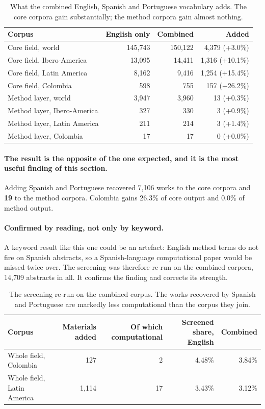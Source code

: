 \documentclass[11pt,a4paper]{article}
\begin{document}
\begin{table}[htbp]
\centering
\caption{What the combined English, Spanish and Portuguese vocabulary adds. The core
corpora gain substantially; the method corpora gain almost nothing.}
\label{tab:combined}
\small
\begin{tabular}{lrrr}
\toprule
Corpus & English only & Combined & Added \\
\midrule
Core field, world & 145,743 & 150,122 & 4,379 (+3.0\%) \\
Core field, Ibero-America & 13,095 & 14,411 & 1,316 (+10.1\%) \\
Core field, Latin America & 8,162 & 9,416 & 1,254 (+15.4\%) \\
Core field, Colombia & 598 & 755 & 157 (+26.2\%) \\
Method layer, world & 3,947 & 3,960 & 13 (+0.3\%) \\
Method layer, Ibero-America & 327 & 330 & 3 (+0.9\%) \\
Method layer, Latin America & 211 & 214 & 3 (+1.4\%) \\
Method layer, Colombia & 17 & 17 & 0 (+0.0\%) \\
\bottomrule
\end{tabular}
\end{table}


\paragraph{The result is the opposite of the one expected, and it is the most useful finding
of this section.} Adding Spanish and Portuguese recovered 7,106 works to the core corpora
and \textbf{19} to the method corpora. Colombia gains 26.3\% of core output and 0.0\% of
method output.

\paragraph{Confirmed by reading, not only by keyword.} A keyword result like this one could
be an artefact: English method terms do not fire on Spanish abstracts, so a Spanish-language
computational paper would be missed twice over. The screening was therefore re-run on the
combined corpora, 14{,}709 abstracts in all. It confirms the finding and corrects its
strength.


\begin{table}[htbp]
\centering
\caption{The screening re-run on the combined corpus. The works recovered by Spanish and
Portuguese are markedly less computational than the corpus they join.}
\label{tab:screened-combined}
\small
\begin{tabular}{lrrrr}
\toprule
Corpus & Materials added & Of which computational & Screened share, English & Combined \\
\midrule
Whole field, Colombia & 127 & 2 & 4.48\% & 3.84\% \\
Whole field, Latin America & 1,114 & 17 & 3.43\% & 3.12\% \\
\bottomrule
\end{tabular}
\end{table}
\end{document}
